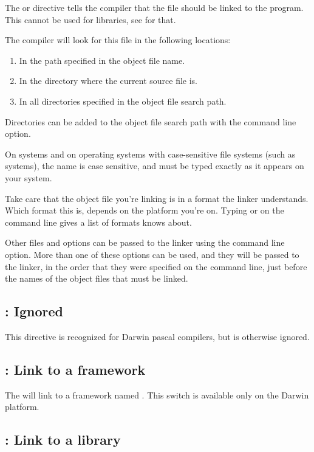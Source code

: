 The  or  directive
tells the compiler that the file  should be linked to
the program. This cannot be used for libraries, see  for that.

The compiler will look for this file in the following locations:
\begin{enumerate}
\item In the path specified in the object file name.
\item In the directory where the current source file is.
\item In all directories specified in the object file search path.
\end{enumerate}
Directories can be added to the object file search path with the 
command line option.

On \linux systems and on operating systems with case-sensitive file systems
(such as \unix systems), the name is case sensitive, and must be typed
exactly as it appears on your system.

\begin{remark}Take care that the object file you're linking is in a
format the linker understands. Which format this is, depends on the platform
you're on. Typing  or  on the command line gives a list of formats
 knows about.
\end{remark}

Other files and options can be passed to the linker using the 
command line option. More than one of these options can be used, and
they will be passed to the linker, in the order that they were specified on
the command line, just before the names of the object files that must be
linked.

\subsection{ : Ignored}
This directive is recognized for Darwin pascal compilers, but is otherwise
ignored.

\subsection{ : Link to a framework}
The  will link to a framework named
. This switch is available only on the Darwin platform.

\subsection{ : Link to a library}
\label{se:linklib}

